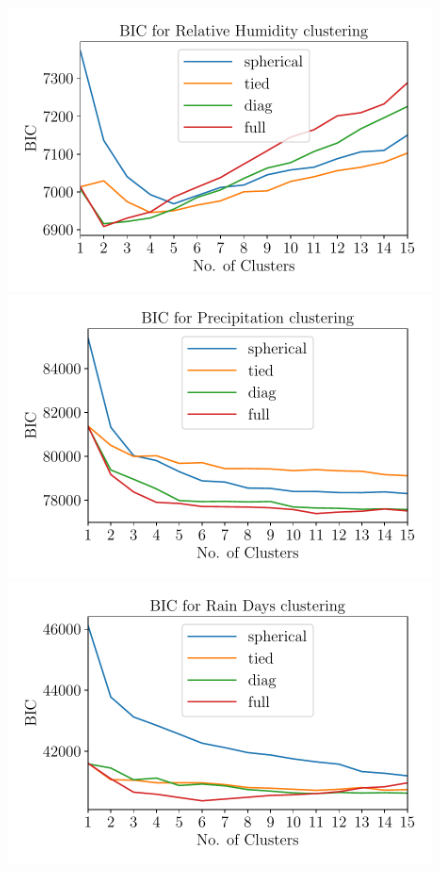 \documentclass[a4paper,fleqn,usenatbib]{mnras}
\begin{document}
\begin{figure}
\begin{center}
\includegraphics[scale=0.5]{bich.pdf}
\includegraphics[scale=0.5]{bicl.pdf}\\
\includegraphics[scale=0.5]{bicd.pdf}

\end{center}
\end{figure}
\end{document}
